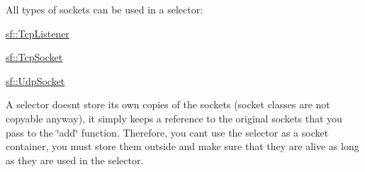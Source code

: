 All types of sockets can be used in a selector\+: \begin{DoxyItemize}
\item \hyperlink{classsf_1_1_tcp_listener}{sf\+::\+Tcp\+Listener} \item \hyperlink{classsf_1_1_tcp_socket}{sf\+::\+Tcp\+Socket} \item \hyperlink{classsf_1_1_udp_socket}{sf\+::\+Udp\+Socket}\end{DoxyItemize}
A selector doesn\textquotesingle{}t store its own copies of the sockets (socket classes are not copyable anyway), it simply keeps a reference to the original sockets that you pass to the \char`\"{}add\char`\"{} function. Therefore, you can\textquotesingle{}t use the selector as a socket container, you must store them outside and make sure that they are alive as long as they are used in the selector.

